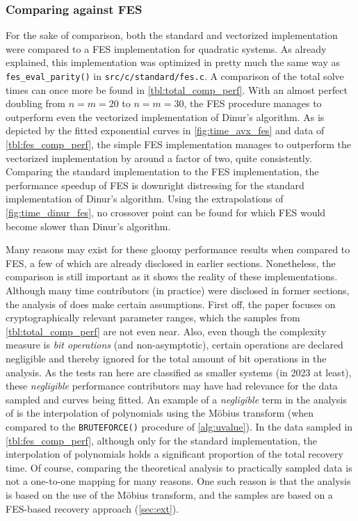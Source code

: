 \subsubsection{Comparing against FES}

For the sake of comparison, both the standard and vectorized implementation were compared to a FES implementation for quadratic systems. As already explained, this implementation was optimized in pretty much the same way as \texttt{fes\_eval\_parity()} in \texttt{src/c/standard/fes.c}. A comparison of the total solve times can once more be found in \cref{tbl:total_comp_perf}. With an almost perfect doubling from $n = m = 20$ to $n = m = 30$, the FES procedure manages to outperform even the vectorized implementation of Dinur's algorithm. As is depicted by the fitted exponential curves in \cref{fig:time_avx_fes} and data of \cref{tbl:fes_comp_perf}, the simple FES implementation manages to outperform the vectorized implementation by around a factor of two, quite consistently. Comparing the standard implementation to the FES implementation, the performance speedup of FES is downright distressing for the standard implementation of Dinur's algorithm. Using the extrapolations of \cref{fig:time_dinur_fes}, no crossover point can be found for which FES would become slower than Dinur's algorithm.

Many reasons may exist for these gloomy performance results when compared to FES, a few of which are already disclosed in earlier sections. Nonetheless, the comparison is still important as it shows the reality of these implementations. Although many time contributors (in practice) were disclosed in former sections, the analysis of \cite{eurocrypt-2021-30841} does make certain assumptions. First off, the paper focuses on cryptographically relevant parameter ranges, which the samples from \cref{tbl:total_comp_perf} are not even near. Also, even though the complexity measure is \textit{bit operations} (and non-asymptotic), certain operations are declared negligible and thereby ignored for the total amount of bit operations in the analysis. As the tests ran here are classified as smaller systems (in 2023 at least), these \textit{negligible} performance contributors may have had relevance for the data sampled and curves being fitted. An example of a \textit{negligible} term in the analysis of \cite{eurocrypt-2021-30841} is the interpolation of polynomials using the Möbius transform (when compared to the \texttt{BRUTEFORCE()} procedure of \cref{alg:uvalue}). In the data sampled in \cref{tbl:fes_comp_perf}, although only for the standard implementation, the interpolation of polynomials holds a significant proportion of the total recovery time. Of course, comparing the theoretical analysis to practically sampled data is not a one-to-one mapping for many reasons. One such reason is that the analysis is based on the use of the Möbius transform, and the samples are based on a FES-based recovery approach (\cref{sec:ext}).


